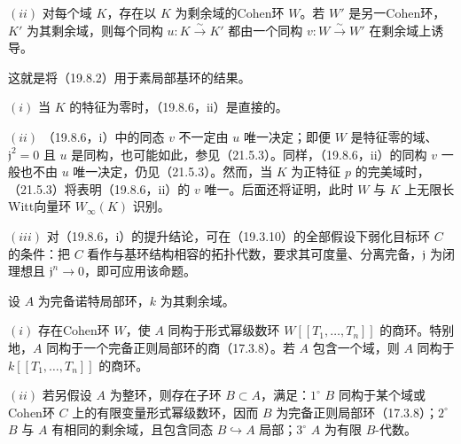 $(ii)$ 对每个域 $K$，存在以 $K$ 为剩余域的Cohen环 $W$。若 $W'$ 是另一Cohen环，$K'$ 为其剩余域，则每个同构 $u:K\xrightarrow{\sim}K'$ 都由一个同构 $v:W\xrightarrow{\sim}W'$ 在剩余域上诱导。

这就是将（19.8.2）用于素局部基环的结果。

$(i)$ 当 $K$ 的特征为零时，（19.8.6，ii）是直接的。

$(ii)$ （19.8.6，i）中的同态 $v$ 不一定由 $u$ 唯一决定；即便 $W$ 是特征零的域、$\mathfrak j^2=0$ 且 $u$ 是同构，也可能如此，参见（21.5.3）。同样，（19.8.6，ii）的同构 $v$ 一般也不由 $u$ 唯一决定，仍见（21.5.3）。然而，当 $K$ 为正特征 $p$ 的完美域时，（21.5.3）将表明（19.8.6，ii）的 $v$ 唯一。后面还将证明，此时 $W$ 与 $K$ 上无限长Witt向量环 $W_\infty(K)$ 识别。

$(iii)$ 对（19.8.6，i）的提升结论，可在（19.3.10）的全部假设下弱化目标环 $C$ 的条件：把 $C$ 看作与基环结构相容的拓扑代数，要求其可度量、分离完备，$\mathfrak j$ 为闭理想且 $\mathfrak j^n\to0$，即可应用该命题。

设 $A$ 为完备诺特局部环，$k$ 为其剩余域。

$(i)$ 存在Cohen环 $W$，使 $A$ 同构于形式幂级数环 $W[[T_1,\ldots,T_n]]$ 的商环。特别地，$A$ 同构于一个完备正则局部环的商（17.3.8）。若 $A$ 包含一个域，则 $A$ 同构于 $k[[T_1,\ldots,T_n]]$ 的商环。

$(ii)$ 若另假设 $A$ 为整环，则存在子环 $B\subset A$，满足：$1^\circ$ $B$ 同构于某个域或Cohen环 $C$ 上的有限变量形式幂级数环，因而 $B$ 为完备正则局部环（17.3.8）；$2^\circ$ $B$ 与 $A$ 有相同的剩余域，且包含同态 $B\hookrightarrow A$ 局部；$3^\circ$ $A$ 为有限 $B$-代数。

